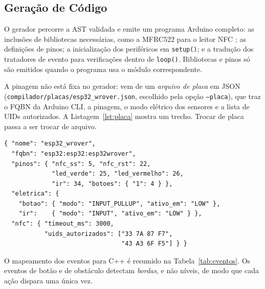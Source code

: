 \documentclass[conference]{IEEEtran}
\begin{document}
\subsection{Geração de Código}
O gerador percorre a AST validada e emite um programa Arduino completo: as
inclusões de bibliotecas necessárias, como a MFRC522 para o leitor NFC
\cite{mfrc522}; as definições de pinos; a inicialização dos periféricos em
\texttt{setup()}; e a tradução dos tratadores de evento para verificações
dentro de \texttt{loop()}. Bibliotecas e pinos só são emitidos quando o
programa usa o módulo correspondente.

A pinagem não está fixa no gerador: vem de um \emph{arquivo de placa} em JSON
(\texttt{compilador/placas/esp32\_wrover.json}, escolhido pela opção
\texttt{--placa}), que traz o FQBN da Arduino CLI, a pinagem, o modo elétrico
dos sensores e a lista de UIDs autorizados. A Listagem~\ref{lst:placa} mostra
um trecho. Trocar de placa passa a ser trocar de arquivo.

\begin{lstlisting}[basicstyle=\ttfamily\tiny, numbers=none, xleftmargin=0pt, framexleftmargin=0pt, caption={Trecho do arquivo de placa \texttt{esp32\_wrover.json}.}, label={lst:placa}]
{ "nome": "esp32_wrover",
  "fqbn": "esp32:esp32:esp32wrover",
  "pinos": { "nfc_ss": 5, "nfc_rst": 22,
             "led_verde": 25, "led_vermelho": 26,
             "ir": 34, "botoes": { "1": 4 } },
  "eletrica": {
    "botao": { "modo": "INPUT_PULLUP", "ativo_em": "LOW" },
    "ir":    { "modo": "INPUT", "ativo_em": "LOW" } },
  "nfc": { "timeout_ms": 3000,
           "uids_autorizados": ["33 7A 87 F7",
                                "43 A3 6F F5"] } }
\end{lstlisting}

O mapeamento dos eventos para C++ é resumido na Tabela~\ref{tab:eventos}.
Os eventos de botão e de obstáculo detectam \emph{bordas}, e não níveis, de
modo que cada ação dispara uma única vez.
\end{document}
